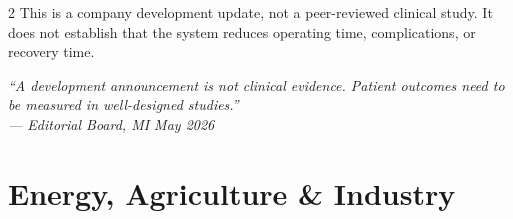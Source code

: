 \documentclass[10pt, a4paper]{article}
\newcommand{\ruled}{%
  \par\vspace{0.3em}%
  \noindent{\color{electric}\rule{\linewidth}{0.4pt}}\par
  \vspace{0.3em}}
\begin{document}
\begin{multicols}{2}
{\small
This is a company development update, not a peer-reviewed clinical study. It does not establish that the system reduces operating time, complications, or recovery time.
}

\begin{pullquote}
  {\large\itshape\color{white}
  ``A development announcement is not clinical evidence. Patient outcomes
  need to be measured in well-designed studies.''\\[4pt]
  {\footnotesize\color{electric}--- Editorial Board, MI May 2026}}
\end{pullquote}

\ruled

\end{multicols}

\clearpage

\section{Energy, Agriculture \& Industry}
\end{document}
